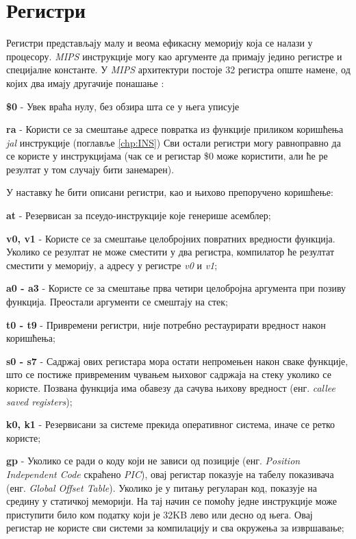 \documentclass[12pt,oneside]{memoir}
\begin{document}
\section{Регистри} \label{chp:REG}

Регистри представљају малу и веома ефикасну меморију која се налази у процесору. \textit{MIPS} инструкције могу као
аргументе да примају једино регистре и специјалне константе. У \textit{MIPS} архитектури постоје 32 регистра опште
намене, од којих два имају другачије понашање \cite{SMR}:

\textbf{\$0} - Увек враћа нулу, без обзира шта се у њега уписује

\textbf{ra} - Користи се за смештање адресе повратка из функције приликом коришћења \textit{jal}
инструкције (поглавље \ref{chp:INS})
Сви остали регистри могу равноправно да се користе у инструкцијама (чак се и регистар \$0 може користити, али ће ре
резултат у том случају бити занемарен).

У наставку ће бити описани регистри, као и њихово препоручено коришћење:

\textbf{at} - Резервисан за псеудо-инструкције које генерише асемблер;

\textbf{v0, v1} - Користе се за смештање целобројних повратних вредности функција. Уколико се резултат не може
сместити у два регистра, компилатор ће резултат сместити у меморију, а адресу у регистре \textit{v0} и \textit{v1};

\textbf{a0 - a3} - Користе се за смештање прва четири целобројна аргумента при позиву функција. Преостали аргументи се смештају
на стек;

\textbf{t0 - t9} - Привремени регистри, није потребно рестаурирати вредност након коришћења;

\textbf{s0 - s7} - Садржај ових регистара мора остати непромењен након сваке функције, што се постиже привременим
чувањем њиховог садржаја на стеку уколико се користе. Позвана функција има обавезу да сачува њихову вредност (енг.
\textit{callee saved registers});

\textbf{k0, k1} - Резервисани за системе прекида оперативног система, иначе се ретко користе;

\textbf{gp} - Уколико се ради о коду који не зависи од позиције (енг. \textit{Position
Independent Code} скраћено \textit{PIC}), овај регистар показује на табелу показивача (енг. \textit{Global Offset
Table}). Уколико је у питању регуларан код, показује на средину у статичкој меморији. На тај начин се помоћу једне
инструкције може приступити било ком податку који је 32KB лево или десно од њега. Овај регистар не користе сви
системи за компилацију и сва окружења за извршавање;
\end{document}
